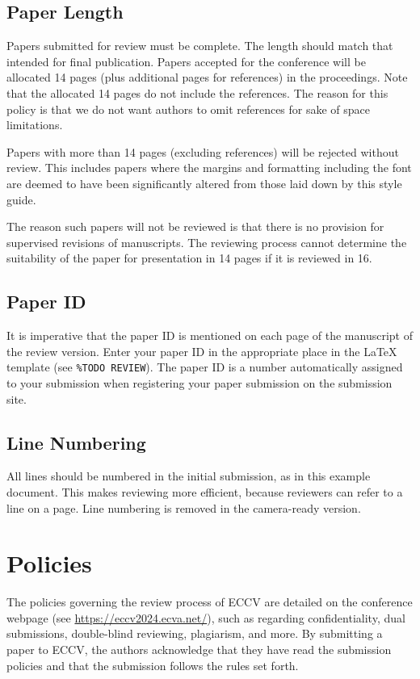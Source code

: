 \documentclass[runningheads]{llncs}
\begin{document}
\subsection{Paper Length}
Papers submitted for review must be complete. 
The length should match that intended for final publication. 
Papers accepted for the conference will be allocated 14 pages (plus additional pages for references) in the proceedings. 
Note that the allocated 14 pages do not include the references. 
The reason for this policy is that we do not want authors to omit references for sake of space limitations.

Papers with more than 14 pages (excluding references) will be rejected without review.
This includes papers where the margins and formatting including the font are deemed to have been significantly altered from those laid down by this style guide.

The reason such papers will not be reviewed is that there is no provision for supervised revisions of manuscripts. 
The reviewing process cannot determine the suitability of the paper for presentation in 14 pages if it is reviewed in 16.


\subsection{Paper ID}
It is imperative that the paper ID is mentioned on each page of the manuscript of the review version.
Enter your paper ID in the appropriate place in the \LaTeX{} template (see \texttt{\%TODO REVIEW}).
The paper ID is a number automatically assigned to your submission when registering your paper submission on the submission site.


\subsection{Line Numbering}
\label{sec:line-numbering}
All lines should be numbered in the initial submission, as in this example document. 
This makes reviewing more efficient, because reviewers can refer to a line on a page. 
Line numbering is removed in the camera-ready version.


\section{Policies}
The policies governing the review process of ECCV \ECCVyear{} are detailed on the conference webpage (see \url{https://eccv2024.ecva.net/}), such as regarding confidentiality, dual submissions, double-blind reviewing, plagiarism, and more. 
By submitting a paper to ECCV, the authors acknowledge that they have read the submission policies and that the submission follows the rules set forth.
\end{document}
